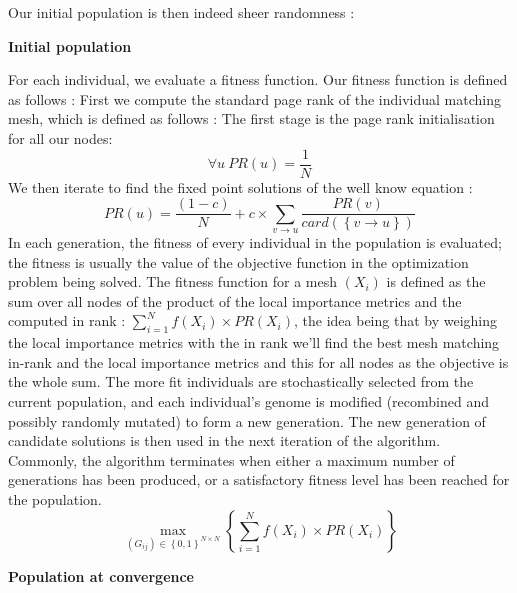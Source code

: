 \documentclass{iSWAGArticle}
\begin{document}
Our initial population is then indeed sheer randomness :
\begin{center}
\textbf{\large Initial population}
\end{center}
\begin{center}
\end{center}
For each individual, we evaluate a fitness function. Our fitness function is defined as follows :
First we compute the standard page rank of the individual matching mesh, which is defined as follows :
The first stage is the page rank initialisation for all our nodes:
\begin{equation}
\forall u \ PR\left(u\right)=\frac{1}{N}
\end{equation} 
We then iterate to find the fixed point solutions of the well know equation :
\begin{equation}
PR\left(u\right)= \frac{\left(1-c\right)}{N} + c \times \sum_{v \rightarrow u}\frac{PR\left(v\right)}{card\left(\left\{v\rightarrow u\right\}\right)}
\end{equation}
In each generation, the fitness of every individual in the population is evaluated; 
the fitness is usually the value of the objective function in the optimization problem being solved.
The fitness function for a mesh $\left(X_i\right)$ is defined as the sum over all nodes of the product of the local importance metrics
and the computed in rank : $\sum^{N}_{i=1} f\left(X_i\right)\times PR(X_i)$, the idea being that by weighing the local importance metrics with the in rank
we'll find the best mesh matching in-rank and the local importance metrics and this for all nodes as the objective is the whole sum. 
 The more fit individuals are stochastically selected from the current population, 
and each individual's genome is modified (recombined and possibly randomly mutated) to form a new generation. 
The new generation of candidate solutions is then used in the next iteration of the algorithm. 
Commonly, the algorithm terminates when either a maximum number of generations has been produced, 
or a satisfactory fitness level has been reached for the population.
\begin{equation}
\max_{\left(G_{ij}\right)  \in \left\{0,1\right\}^{N\times N}}\left\{ \sum^{N}_{i=1} f\left(X_i\right)\times PR(X_i)\right\}
\end{equation}

\begin{center}
\textbf{\large Population at convergence}
\end{center}
\begin{center}
\end{center}
\end{document}
